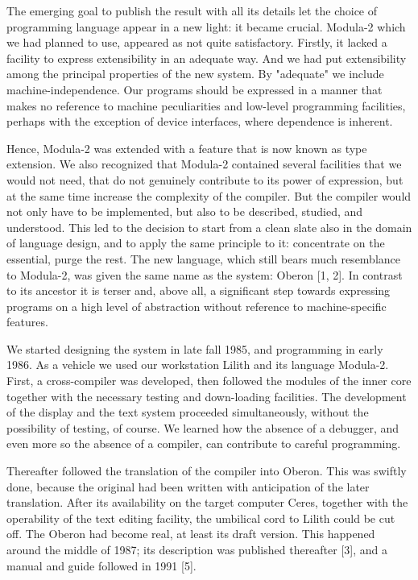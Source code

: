 The emerging goal to publish the result with all its details let the choice of programming language
appear in a new light: it became crucial. Modula-2 which we had planned to use, appeared as not
quite satisfactory. Firstly, it lacked a facility to express extensibility in an adequate way. And we had
put extensibility among the principal properties of the new system. By "adequate" we include
machine-independence. Our programs should be expressed in a manner that makes no reference
to machine peculiarities and low-level programming facilities, perhaps with the exception of device
interfaces, where dependence is inherent.

Hence, Modula-2 was extended with a feature that is now known as type extension. We also
recognized that Modula-2 contained several facilities that we would not need, that do not genuinely
contribute to its power of expression, but at the same time increase the complexity of the compiler.
But the compiler would not only have to be implemented, but also to be described, studied, and
understood. This led to the decision to start from a clean slate also in the domain of language
design, and to apply the same principle to it: concentrate on the essential, purge the rest. The new
language, which still bears much resemblance to Modula-2, was given the same name as the
system: Oberon [1, 2]. In contrast to its ancestor it is terser and, above all, a significant step
towards expressing programs on a high level of abstraction without reference to machine-specific
features.

We started designing the system in late fall 1985, and programming in early 1986. As a vehicle we
used our workstation Lilith and its language Modula-2. First, a cross-compiler was developed, then
followed the modules of the inner core together with the necessary testing and down-loading
facilities. The development of the display and the text system proceeded simultaneously, without
the possibility of testing, of course. We learned how the absence of a debugger, and even more so
the absence of a compiler, can contribute to careful programming.

Thereafter followed the translation of the compiler into Oberon. This was swiftly done, because the
original had been written with anticipation of the later translation. After its availability on the target
computer Ceres, together with the operability of the text editing facility, the umbilical cord to Lilith
could be cut off. The Oberon had become real, at least its draft version. This happened
around the middle of 1987; its description was published thereafter [3], and a manual and guide
followed in 1991 [5].

